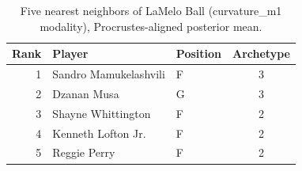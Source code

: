 \begin{table}[htbp]
  \centering\small
  \begin{tabular}{rllc}
    \toprule
    Rank & Player & Position & Archetype \\
    \midrule
    1 & Sandro Mamukelashvili & F & 3 \\
    2 & Dzanan Musa & G & 3 \\
    3 & Shayne Whittington & F & 2 \\
    4 & Kenneth Lofton Jr. & F & 2 \\
    5 & Reggie Perry & F & 2 \\
    \bottomrule
  \end{tabular}
  \caption{Five nearest neighbors of LaMelo Ball (curvature_m1 modality), Procrustes-aligned posterior mean.}
  \label{tab:LaMelo_Ball_neighbors_curvature_m1}
\end{table}

